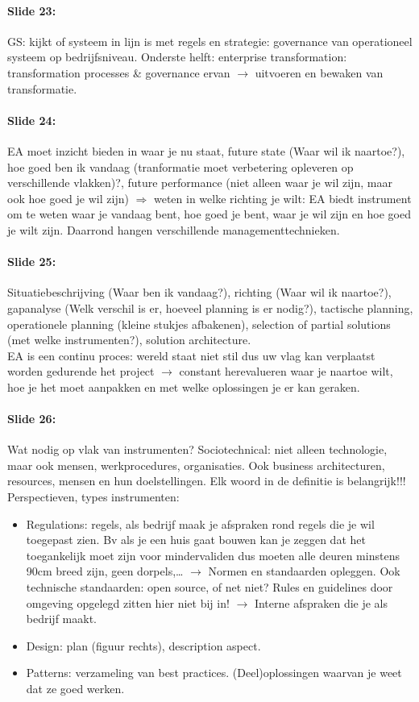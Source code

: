 \documentclass[10pt,a4paper]{report}
\begin{document}
\paragraph{Slide 23:}GS: kijkt of systeem in lijn is met regels en strategie: governance van operationeel systeem op bedrijfsniveau. Onderste helft: enterprise transformation: transformation processes \& governance ervan $\rightarrow$ uitvoeren en bewaken van transformatie.

\paragraph{Slide 24:}EA moet inzicht bieden in waar je nu staat, future state (Waar wil ik naartoe?), hoe goed ben ik vandaag (tranformatie moet verbetering opleveren op verschillende vlakken)?, future performance (niet alleen waar je wil zijn, maar ook hoe goed je wil zijn) $\Rightarrow$ weten in welke richting je wilt: EA biedt instrument om te weten waar je vandaag bent, hoe goed je bent, waar je wil zijn en hoe goed je wilt zijn.
Daarrond hangen verschillende managementtechnieken.

\paragraph{Slide 25:}Situatiebeschrijving (Waar ben ik vandaag?), richting (Waar wil ik naartoe?), gapanalyse (Welk verschil is er, hoeveel planning is er nodig?), tactische planning, operationele planning (kleine stukjes afbakenen), selection of partial solutions (met welke instrumenten?), solution architecture.\\
EA is een continu proces: wereld staat niet stil dus uw vlag kan verplaatst worden gedurende het project $\rightarrow$ constant herevalueren waar je naartoe wilt, hoe je het moet aanpakken en met welke oplossingen je er kan geraken.

\paragraph{Slide 26:}Wat nodig op vlak van instrumenten? Sociotechnical: niet alleen technologie, maar ook mensen, werkprocedures, organisaties. Ook business architecturen, resources, mensen en hun doelstellingen. Elk woord in de definitie is belangrijk!!! 
Perspectieven, types instrumenten:
\begin{itemize}
\item Regulations: regels, als bedrijf maak je afspraken rond regels die je wil toegepast zien. Bv als je een huis gaat bouwen kan je zeggen dat het toegankelijk moet zijn voor mindervaliden dus moeten alle deuren minstens 90cm breed zijn, geen dorpels,… $\rightarrow$ Normen en standaarden opleggen. Ook technische standaarden: open source, of net niet? Rules en guidelines door omgeving opgelegd zitten hier niet bij in! $\rightarrow$ Interne afspraken die je als bedrijf maakt.
\item Design: plan (figuur rechts), description aspect.
\item Patterns: verzameling van best practices. (Deel)oplossingen waarvan je weet dat ze goed werken.
\end{itemize}
	
\end{document}
